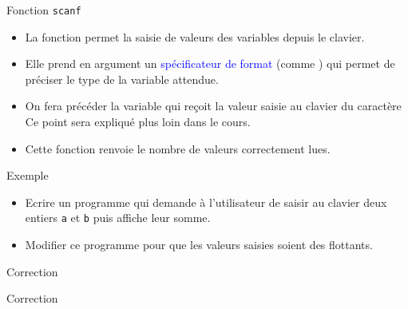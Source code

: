 \documentclass[10pt]{beamer}
\begin{document}
\begin{frame}[fragile]{\Ctitle}{\stitle}
	\begin{block}{Fonction {\tt scanf}}
		\begin{itemize}
			\item<1-> La fonction  permet la saisie de valeurs des variables depuis le clavier.
			\item<2-> Elle prend en argument un \textcolor{blue}{spécificateur de format} (comme ) qui permet de préciser le type de la variable attendue.
			\item<3-> On fera précéder la variable qui reçoit la valeur saisie au clavier du caractère \kw{\&} \\
				\onslide<4-> Ce point sera expliqué plus loin dans le cours.
			\item<5-> Cette fonction renvoie le nombre de valeurs correctement lues.
		\end{itemize}
	\end{block}
	\begin{exampleblock}{Exemple}
		\begin{itemize}
			\item<6-> Ecrire un programme qui demande à l'utilisateur de saisir au clavier deux entiers {\tt a} et {\tt b} puis affiche leur somme.
			\item<7-> Modifier ce programme pour que les valeurs saisies soient des flottants.
		\end{itemize}
	\end{exampleblock}
\end{frame}

\begin{frame}{\Ctitle}{\stitle}
	\begin{exampleblock}{Correction}
	\end{exampleblock}
\end{frame}

\begin{frame}{\Ctitle}{\stitle}
	\begin{exampleblock}{Correction}
	\end{exampleblock}
\end{frame}
\end{document}
